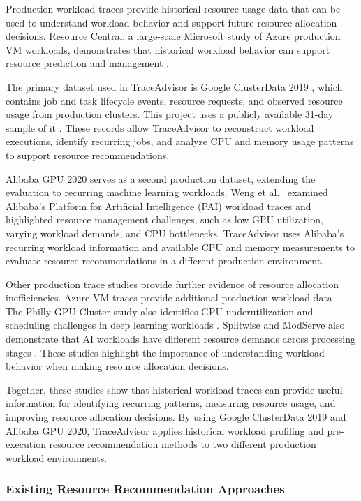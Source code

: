 \documentclass{IEEEtran}
\begin{document}
Production workload traces provide historical resource usage data that can be used to understand workload behavior and support future resource allocation decisions. Resource Central, a large-scale Microsoft study of Azure production VM workloads, demonstrates that historical workload behavior can support resource prediction and management \cite{ref2}.

The primary dataset used in TraceAdvisor is Google ClusterData 2019 \cite{ref7}, which contains job and task lifecycle events, resource requests, and observed resource usage from production clusters. This project uses a publicly available 31-day sample of it \cite{ref8}. These records allow TraceAdvisor to reconstruct workload executions, identify recurring jobs, and analyze CPU and memory usage patterns to support resource recommendations.

Alibaba GPU 2020 \cite{ref19} serves as a second production dataset, extending the evaluation to recurring machine learning workloads. Weng et al.~\cite{ref9} examined Alibaba's Platform for Artificial Intelligence (PAI) workload traces and highlighted resource management challenges, such as low GPU utilization, varying workload demands, and CPU bottlenecks. TraceAdvisor uses Alibaba's recurring workload information and available CPU and memory measurements to evaluate resource recommendations in a different production environment.

Other production trace studies provide further evidence of resource allocation inefficiencies. Azure VM traces provide additional production workload data \cite{ref10}. The Philly GPU Cluster study also identifies GPU underutilization and scheduling challenges in deep learning workloads \cite{ref11}. Splitwise and ModServe also demonstrate that AI workloads have different resource demands across processing stages \cite{ref12,ref13}. These studies highlight the importance of understanding workload behavior when making resource allocation decisions.

Together, these studies show that historical workload traces can provide useful information for identifying recurring patterns, measuring resource usage, and improving resource allocation decisions. By using Google ClusterData 2019 and Alibaba GPU 2020, TraceAdvisor applies historical workload profiling and pre-execution resource recommendation methods to two different production workload environments.

\subsubsection{Existing Resource Recommendation Approaches}\label{sec:1.3.3}
\end{document}

